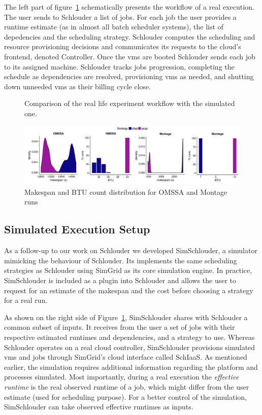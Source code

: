 \documentclass[10pt,conference,compsocconf]{IEEEtran}
\begin{document}
The left  part of figure~\ref{fig:rs}  schematically presents the workflow  of a
real execution.  The  user sends to Schlouder  a list of jobs. For  each job the
user provides a runtime estimate (as in almost all batch scheduler systems), the
list  of  depedencies  and  the scheduling  strategy.   Schlouder  computes  the
scheduling and resource provisioning decisions  and communicates its requests to
the  cloud's  frontend,  denoted  Controller.   Once  the  \acp{vm}  are  booted
Schlouder  sends each  job to  its  assigned machine.   Schlouder tracks  jobs
progression, completing the schedule  as dependencies are resolved, provisioning
\acp{vm} as needed,  and shutting down unneeded \acp{vm} as  their billing cycle
close.

\begin{figure}
	\resizebox{0.5\textwidth}{!}{%
		
		
	}%
	\caption{Comparison of the real life experiment workflow with the
	simulated one.}\label{fig:rs}
\end{figure}
\begin{figure}
	\centering
	\includegraphics[width=\textwidth]{gfx/real_plot.pdf}
	\caption{Makespan and BTU count distribution for OMSSA and Montage
	runs\label{fig:realbrs}}
\end{figure}

\subsection{Simulated Execution Setup}
As a follow-up  to our work on Schlouder we  developed SimSchlouder, a simulator
mimicking  the  behaviour  of  Schlouder. Its  implements  the  same  scheduling
strategies  as  Schlouder  using  SimGrid  as its  core  simulation  engine.  In
practice, SimSchlouder  is included as  a plugin  into Schlouder and  allows the
user to request for  an estimate of the makespan and the  cost before choosing a
strategy for a real run.

As  shown on  the right  side of  Figure~\ref{fig:rs}, SimSchlouder  shares with
Schlouder a common  subset of inputs.  It  receives from the user a  set of jobs
with their  respective estimated  runtimes and dependencies,  and a  strategy to
use.  Whereas  Schlouder  operates  on a  real  cloud  controller,  SimSchlouder
provisions simulated \acp{vm} and jobs  through SimGrid's cloud interface called
SchIaaS. As  mentioned earlier,  the simulation requires  additional information
regarding the platform and processes simulated.
Most importantly, during a real execution  the \emph{effective runtime} is the
real observed runtime of a job, which might differ from the user estimate (used 
for scheduling purpose). For a better control of the simulation, SimSchlouder
can take observed effective runtimes as inputs. 
\end{document}
